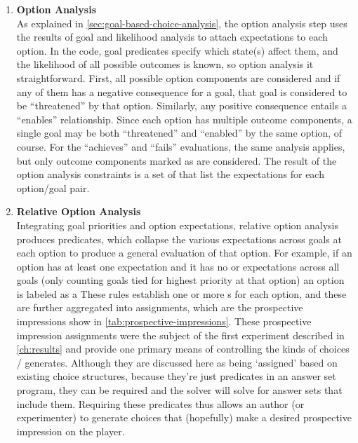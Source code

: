\begin{enumerate}
  \item %
    \textbf{Option Analysis} \\
    \label{page:option-analysis}
    As explained in \cref{sec:goal-based-choice-analysis}, the option analysis step uses the results of goal and likelihood analysis to attach expectations to each option.
    In the code, goal predicates specify which state(s) affect them, and the likelihood of all possible outcomes is known, so option analysis it straightforward.
    First, all possible option components are considered and if any of them has a negative consequence for a goal, that goal is considered to be ``threatened'' by that option.
    Similarly, any positive consequence entails a ``enables'' relationship.
    Since each option has multiple outcome components, a single goal may be both ``threatened'' and ``enabled'' by the same option, of course.
    For the ``achieves'' and ``fails'' evaluations, the same analysis applies, but only outcome components marked as  are considered.
    The result of the option analysis constraints is a set of  that list the expectations for each option/goal pair.

  \item %
    \textbf{Relative Option Analysis} \\
    Integrating goal priorities and option expectations, relative option analysis produces  predicates, which collapse the various expectations across goals at each option to produce a general evaluation of that option.
    For example, if an option has at least one  expectation and it has no  or  expectations across all goals (only counting goals tied for highest priority at that option) an option is labeled as a 
    These rules establish one or more s for each option, and these are further aggregated into  assignments, which are the prospective impressions show in \cref{tab:prospective-impressions}.
    These prospective impression assignments were the subject of the first experiment described in \cref{ch:results} and provide one primary means of controlling the kinds of choices \dunyazad/ generates.
    Although they are discussed here as being `assigned' based on existing choice structures, because they're just predicates in an answer set program, they can be required and the solver will solve for answer sets that include them.
    Requiring these  predicates thus allows an author (or experimenter) to generate choices that (hopefully) make a desired prospective impression on the player.


\end{enumerate}
